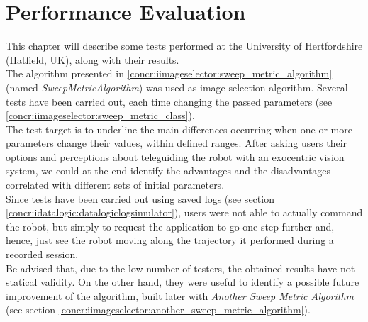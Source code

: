 \setcounter{figure}{0}
\setcounter{table}{0}
\setcounter{lstlisting}{0}

\chapter{Performance Evaluation}
\label{sec:performance_evaluation}
\minitoc

This chapter will describe some tests performed at the 
University of Hertfordshire (Hatfield, UK), along with 
their results. 
\\
The algorithm presented in \ref{concr:iimageselector:sweep_metric_algorithm}
(named \textit{SweepMetricAlgorithm}) was used as image
selection algorithm. Several tests 
have been carried out, each time changing the passed parameters
(see \ref{concr:iimageselector:sweep_metric_class}).
\\
The test target is to underline the main differences 
occurring when one or more parameters change their values, 
within defined ranges. After asking users their options 
and perceptions about teleguiding the robot with an 
exocentric vision system, we could at the end identify 
the advantages and the disadvantages correlated with 
different sets of initial parameters.
\\
Since tests have been carried out using saved logs 
(see section \ref{concr:idatalogic:datalogiclogsimulator}),
users were not 
able to actually command the robot, but simply 
to request the application to go one step
further and, hence, just see the robot moving along 
the trajectory it performed during a recorded 
session.
\\
Be advised that, due to the low number of testers, 
the obtained results have not statical validity.
On the other hand, they were useful to identify 
a possible future improvement of the algorithm,
built later with \textit{Another Sweep Metric Algorithm} 
(see section \ref{concr:iimageselector:another_sweep_metric_algorithm}).

\clearpage

\clearpage

\clearpage

\clearpage

